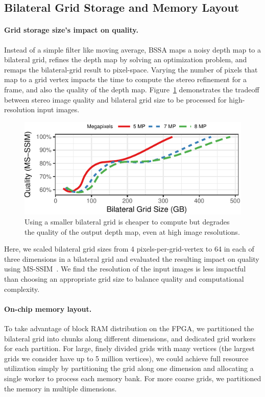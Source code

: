 \subsection{Bilateral Grid Storage and Memory Layout}

\paragraph{Grid storage size's impact on quality.} Instead of a simple filter like moving average, BSSA maps a noisy depth map to a bilateral grid, refines the depth map by solving an optimization problem, and remaps the bilateral-grid result to pixel-space. Varying the number of pixels that map to a grid vertex impacts the time to compute the stereo refinement for a frame, and also the quality of the depth map. Figure~\ref{fig:vr-res-qual} demonstrates the tradeoff between stereo image quality and bilateral grid size to be processed for high-resolution input images.

\begin{figure}[h]
\centering
    \begin{center}
\includegraphics[width=.45\textwidth]{nsp-figs/vr_res_qual.pdf}
    \end{center}
    \caption{Using a smaller bilateral grid is cheaper to compute but degrades the quality of the output depth map, even at high image resolutions. }
    \label{fig:vr-res-qual}
\end{figure}

Here, we scaled bilateral grid sizes from 4 pixels-per-grid-vertex to 64 in each of three dimensions in a bilateral grid and evaluated the resulting impact on quality using MS-SSIM~\cite{msssim}. We find the resolution of the input images is less impactful than choosing an appropriate grid size to balance quality and computational complexity.

\paragraph{On-chip memory layout.}
To take advantage of block RAM distribution on the FPGA, we partitioned the bilateral grid into chunks along different dimensions, and dedicated grid workers for each partition.
For large, finely divided grids with many vertices (the largest grids we consider have up to 5 million vertices), we could achieve full resource utilization simply by partitioning the grid along one dimension and allocating a single worker to process each memory bank.
For more coarse grids, we partitioned the memory in multiple dimensions.

